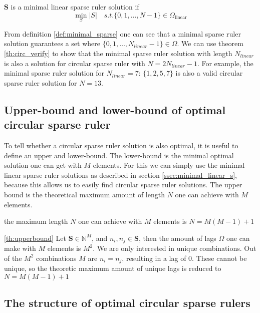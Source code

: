 \documentclass[a4paper, openany, oneside]{memoir}
\begin{document}
\begin{blockDefinition}\label{def:minimal_sparse}
    $\mathbf{S}$ is a minimal linear sparse ruler solution if 
    $$
    \min_S|S| \quad s.t. \{0,1,\dots,N-1\} \in \Omega_{\text{linear}}
    $$
\end{blockDefinition}

From definition \ref{def:minimal_sparse} one can see that a minimal sparse ruler solution guarantees a set where $\{0,1,\dots,N_{linear}-1\} \in \Omega$. We can use theorem \ref{th:circ_verify} to show that the minimal sparse ruler solution with length $N_{linear}$ is also a solution for circular sparse ruler with $N=2N_{linear}-1$.
For example, the minimal sparse ruler solution for $N_{linear}=7$: $\{1,2,5,7\}$ is also a valid circular sparse ruler solution for $N=13$.

\subsection{Upper-bound and lower-bound of optimal circular sparse ruler}
To tell whether a circular sparse ruler solution is also optimal, it is useful to define an upper and lower-bound. The lower-bound is the minimal optimal solution one can get with $M$ elements. For this we can simply use the minimal linear sparse ruler solutions as described in section \ref{ssec:minimal_linear_s}, because this allows us to easily find circular sparse ruler solutions. The upper bound is the theoretical maximum amount of length $N$ one can achieve with $M$ elements.

\begin{blockTheorem} \label{th:upperbound}\nolinebreak
    the maximum length $N$ one can achieve with $M$ elements is $N=M(M-1)+1$\nolinebreak
\end{blockTheorem}

\begin{blockProofTheorem}{\ref{th:upperbound}}
    Let $\mathbf{S} \in \mathbb{N}^M$, and $n_i,n_j \in \mathbf{S}$, then the amount of lags $\Omega$ one can make with $M$ elements is $M^2$. We are only interested in unique combinations. Out of the $M^2$ combinations $M$ are $n_i=n_j$, resulting in a lag of 0. These cannot be unique, so the theoretic maximum amount of unique lags is reduced to $N=M(M-1)+1$
\end{blockProofTheorem}

\subsection{The structure of optimal circular sparse rulers}
\end{document}
